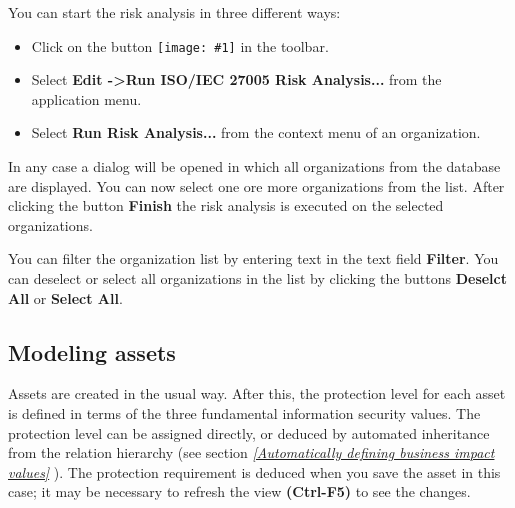 \documentclass[a4paper,10pt]{book}
\newcommand{\icon}[1]{\texttt{[image: \#1]}}
\begin{document}
You can start the risk analysis in three different ways:
\begin{itemize}
 \item Click on the button \icon{Icon/16-paper-calculate-percent.png} in the toolbar.
 \item Select \textbf {Edit -\textgreater Run ISO/IEC 27005 Risk Analysis...} from the application menu.
 \item Select \textbf {Run Risk Analysis...} from the context menu of an organization.
\end{itemize}

In any case a dialog will be opened in which all organizations from the database are displayed. You can now select one ore more organizations from the list. After clicking the button \textbf {Finish} the risk analysis is executed on the selected organizations.

You can filter the organization list by entering text in the text field \textbf {Filter}. You can deselect or select all organizations in the list by clicking the buttons \textbf {Deselct All} or \textbf {Select All}.


\subsection{Modeling assets}
Assets are created in the usual way. After this, the protection level for each asset is defined in terms of the three
fundamental information security values. The protection level can be assigned directly, or deduced by automated inheritance
from the relation hierarchy (see section {\em \ref{Automatically defining business impact values} }). The protection requirement is deduced when you save the asset in this case; it may be necessary to refresh the view \textbf{(Ctrl-F5)} to see the changes.
\end{document}
